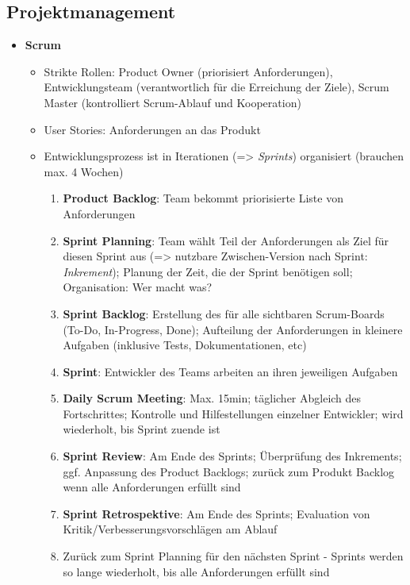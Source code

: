 \documentclass[a4paper, 11pt]{article}
\begin{document}
\subsection{Projektmanagement}
\begin{itemize}
	\item \textbf{Scrum}
	      \begin{itemize}
		      \item Strikte Rollen: Product Owner (priorisiert Anforderungen), Entwicklungsteam (verantwortlich für die Erreichung der Ziele), Scrum Master (kontrolliert Scrum-Ablauf und Kooperation)
		      \item User Stories: Anforderungen an das Produkt
		      \item Entwicklungsprozess ist in Iterationen (=> \textit{Sprints}) organisiert (brauchen max. 4 Wochen)
		            \begin{enumerate}
			            \item \textbf{Product Backlog}: Team bekommt priorisierte Liste von Anforderungen
			            \item \textbf{Sprint Planning}: Team wählt Teil der Anforderungen als Ziel für diesen Sprint aus (=> nutzbare Zwischen-Version nach Sprint: \textit{Inkrement}); Planung der Zeit, die der Sprint benötigen soll; Organisation: Wer macht was?
			            \item \textbf{Sprint Backlog}: Erstellung des für alle sichtbaren Scrum-Boards (To-Do, In-Progress, Done); Aufteilung der Anforderungen in kleinere Aufgaben (inklusive Tests, Dokumentationen, etc)
			            \item \textbf{Sprint}: Entwickler des Teams arbeiten an ihren jeweiligen Aufgaben
			            \item \textbf{Daily Scrum Meeting}: Max. 15min; täglicher Abgleich des Fortschrittes; Kontrolle und Hilfestellungen einzelner Entwickler; wird wiederholt, bis Sprint zuende ist
			            \item \textbf{Sprint Review}: Am Ende des Sprints; Überprüfung des Inkrements; ggf. Anpassung des Product Backlogs; zurück zum Produkt Backlog wenn alle Anforderungen erfüllt sind
			            \item \textbf{Sprint Retrospektive}: Am Ende des Sprints; Evaluation von Kritik/Verbesserungsvorschlägen am Ablauf
			            \item Zurück zum Sprint Planning für den nächsten Sprint - Sprints werden so lange wiederholt, bis alle Anforderungen erfüllt sind
		            \end{enumerate}

\end{itemize}
\end{itemize}
\end{document}
